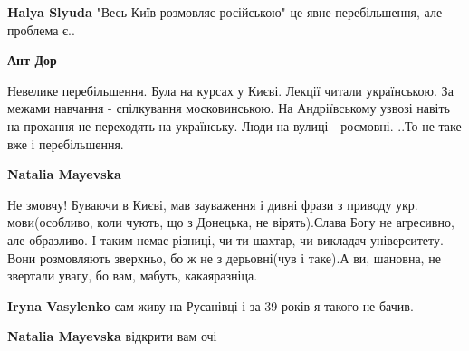 \begin{itemize}
\begin{itemize}
\textbf{Halya Slyuda} "Весь Київ розмовляє російською" це явне перебільшення, але проблема є..

 
\textbf{Ант Дор} 

Невелике перебільшення. Була на курсах у Києві. Лекції читали українською. За
межами навчання - спілкування московинською. На Андріївському узвозі навіть на
прохання не переходять на українську. Люди на вулиці - росмовні. ..То не таке
вже і перебільшення.


 
\textbf{Natalia Mayevska} 

Не змовчу! Буваючи в Києві, мав зауваження і дивні фрази з приводу
укр. мови(особливо, коли чують, що з Донецька, не вірять).Слава Богу не
агресивно, але образливо. І таким немає різниці, чи ти шахтар, чи викладач
університету. Вони розмовляють зверхньо, бо ж не з дерьовні(чув і таке).А
ви, шановна, не звертали увагу, бо вам, мабуть, какаяразніца.

 
\textbf{Iryna Vasylenko} сам живу на Русанівці і за 39 років я такого не бачив.

 
\textbf{Natalia Mayevska} відкрити вам очі

 

\end{itemize}
\end{itemize}
